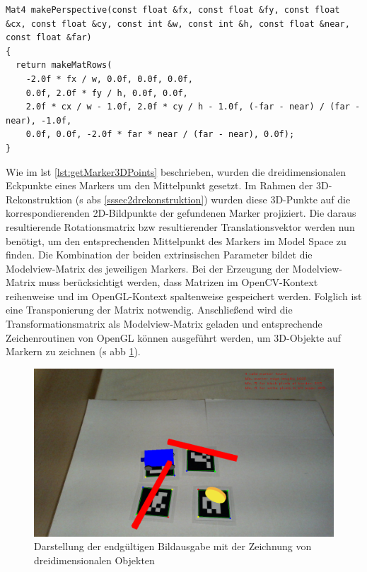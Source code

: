 \newpage

\begin{lstlisting}[caption={Die Funktion \texttt{algebra.cpp/makePerspective()}, die anhand von intrinsischen Parametern eine perspektivische Projektionsmatrix im OpenGL-Kontext erzeugt}, label={lst:makePerspective}]
Mat4 makePerspective(const float &fx, const float &fy, const float &cx, const float &cy, const int &w, const int &h, const float &near, const float &far)
{
  return makeMatRows(
    -2.0f * fx / w, 0.0f, 0.0f, 0.0f,
    0.0f, 2.0f * fy / h, 0.0f, 0.0f,
    2.0f * cx / w - 1.0f, 2.0f * cy / h - 1.0f, (-far - near) / (far - near), -1.0f,
    0.0f, 0.0f, -2.0f * far * near / (far - near), 0.0f);
}
\end{lstlisting}

\noindent Wie im \acs{lst} \ref{lst:getMarker3DPoints} beschrieben, wurden die dreidimensionalen Eckpunkte eines Markers um den Mittelpunkt gesetzt. Im Rahmen der 3D-Rekonstruktion (\acs{s} \acs{abs} \ref{sssec2drekonstruktion}) wurden diese 3D-Punkte auf die korrespondierenden 2D-Bildpunkte der gefundenen Marker projiziert. Die daraus resultierende Rotationsmatrix \acs{bzw} resultierender Translationsvektor werden nun benötigt, um den entsprechenden Mittelpunkt des Markers im Model Space zu finden. Die Kombination der beiden extrinsischen Parameter bildet die Modelview-Matrix des jeweiligen Markers. Bei der Erzeugung der Modelview-Matrix muss berücksichtigt werden, dass Matrizen im OpenCV-Kontext reihenweise und im OpenGL-Kontext spaltenweise gespeichert werden. Folglich ist eine Transponierung der Matrix notwendig. Anschließend wird die Transformationsmatrix als Modelview-Matrix geladen und entsprechende Zeichenroutinen von OpenGL können ausgeführt werden, um 3D-Objekte auf Markern zu zeichnen (\acs{s} \acs{abb} \ref{fig:endproduct}).

\begin{figure}[H]
\centering
\includegraphics[width=15cm]{Bilder/Implementierung/endproduct.png}
\caption{Darstellung der endgültigen Bildausgabe mit der Zeichnung von dreidimensionalen Objekten}
\label{fig:endproduct}
\end{figure}

